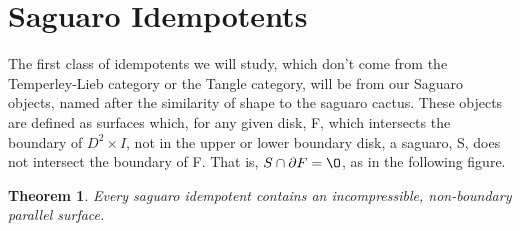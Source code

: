 \documentclass[11pt]{article}
\newcommand{\TL}{Temperley-Lieb }
\newcommand{\parent}{D^2\times I}
\newtheorem*{theorem}{Theorem}
\newcommand{\obj}[1]{\mathscr{O}_{#1}}
\begin{document}




\section*{Saguaro Idempotents}
The first class of idempotents we will study, which don't come from the \TL category or the Tangle category, will be from our Saguaro objects, named after the similarity of shape to the saguaro cactus. These objects are defined as surfaces which, for any given disk, F, which intersects the boundary of $\parent$, not in the upper or lower boundary disk, a saguaro, S, does not intersect the boundary of F. That is, $S\cap\partial F = \O$, as in the following figure. 

\begin{theorem}
 Every saguaro idempotent contains an incompressible, non-boundary parallel surface. 
\end{theorem}
\end{document}
